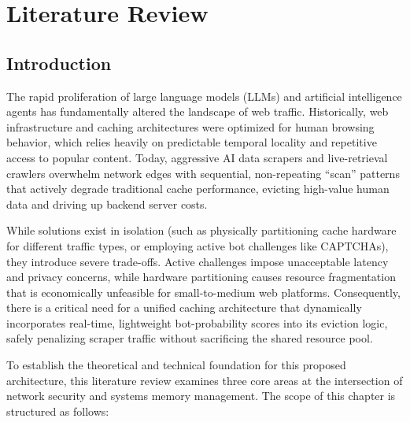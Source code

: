 \chapter{Literature Review}

\label{chap:literature_review}

\section{Introduction}
The rapid proliferation of large language models (LLMs) and artificial intelligence agents has fundamentally altered the landscape of web traffic. Historically, web infrastructure and caching architectures were optimized for human browsing behavior, which relies heavily on predictable temporal locality and repetitive access to popular content. Today, aggressive AI data scrapers and live-retrieval crawlers overwhelm network edges with sequential, non-repeating ``scan'' patterns that actively degrade traditional cache performance, evicting high-value human data and driving up backend server costs.

While solutions exist in isolation (such as physically partitioning cache hardware for different traffic types, or employing active bot challenges like CAPTCHAs), they introduce severe trade-offs. Active challenges impose unacceptable latency and privacy concerns, while hardware partitioning causes resource fragmentation that is economically unfeasible for small-to-medium web platforms. Consequently, there is a critical need for a unified caching architecture that dynamically incorporates real-time, lightweight bot-probability scores into its eviction logic, safely penalizing scraper traffic without sacrificing the shared resource pool.

To establish the theoretical and technical foundation for this proposed architecture, this literature review examines three core areas at the intersection of network security and systems memory management. The scope of this chapter is structured as follows:


